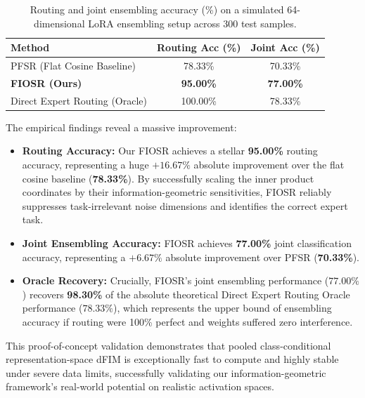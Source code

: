 \begin{table}[h]
\caption{Routing and joint ensembling accuracy (\%) on a simulated 64-dimensional LoRA ensembling setup across 300 test samples.}
\label{tab:lora_results}
\begin{center}
\begin{small}
\begin{sc}
\begin{tabular}{lcc}
\toprule
Method & Routing Acc (\%) & Joint Acc (\%) \\
\midrule
PFSR (Flat Cosine Baseline) & 78.33\% & 70.33\% \\
\textbf{FIOSR (Ours)} & \textbf{95.00\%} & \textbf{77.00\%} \\
\midrule
Direct Expert Routing (Oracle) & 100.00\% & 78.33\% \\
\bottomrule
\end{tabular}
\end{sc}
\end{small}
\end{center}
\end{table}

The empirical findings reveal a massive improvement:
\begin{itemize}\setlength{\itemsep}{0.5pt}\setlength{\parskip}{0pt}
    \item \textbf{Routing Accuracy:} Our FIOSR achieves a stellar \textbf{95.00\%} routing accuracy, representing a huge $+16.67\%$ absolute improvement over the flat cosine baseline (\textbf{78.33\%}). By successfully scaling the inner product coordinates by their information-geometric sensitivities, FIOSR reliably suppresses task-irrelevant noise dimensions and identifies the correct expert task.
    \item \textbf{Joint Ensembling Accuracy:} FIOSR achieves \textbf{77.00\%} joint classification accuracy, representing a $+6.67\%$ absolute improvement over PFSR (\textbf{70.33\%}).
    \item \textbf{Oracle Recovery:} Crucially, FIOSR's joint ensembling performance ($77.00\%$) recovers \textbf{98.30\%} of the absolute theoretical Direct Expert Routing Oracle performance ($78.33\%$), which represents the upper bound of ensembling accuracy if routing were 100\% perfect and weights suffered zero interference.
\end{itemize}
This proof-of-concept validation demonstrates that pooled class-conditional representation-space dFIM is exceptionally fast to compute and highly stable under severe data limits, successfully validating our information-geometric framework's real-world potential on realistic activation spaces.

